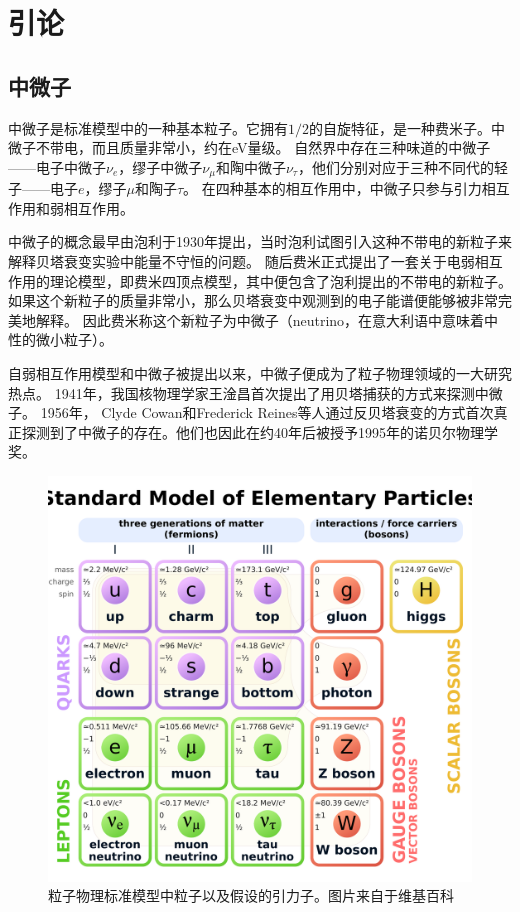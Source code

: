 \chapter{引论}
\label{chap:introduction}

\section{中微子}

中微子是标准模型中的一种基本粒子\cite{Griffiths:2008}。它拥有$1/2$的自旋特征，是一种费米子。中微子不带电，而且质量非常小，约在eV量级。
自然界中存在三种味道的中微子——电子中微子$\nu_e$，缪子中微子$\nu_\mu$和陶中微子$\nu_\tau$，他们分别对应于三种不同代的轻子——电子$e$，缪子$\mu$和陶子$\tau$。
在四种基本的相互作用中，中微子只参与引力相互作用和弱相互作用。

中微子的概念最早由泡利于1930年提出，当时泡利试图引入这种不带电的新粒子来解释贝塔衰变实验中能量不守恒的问题。
随后费米正式提出了一套关于电弱相互作用的理论模型，即费米四顶点模型，其中便包含了泡利提出的不带电的新粒子。
如果这个新粒子的质量非常小，那么贝塔衰变中观测到的电子能谱便能够被非常完美地解释。
因此费米称这个新粒子为中微子（neutrino，在意大利语中意味着中性的微小粒子）。

自弱相互作用模型和中微子被提出以来，中微子便成为了粒子物理领域的一大研究热点。
1941年，我国核物理学家王淦昌首次提出了用贝塔捕获的方式来探测中微子\cite{Wang:1942}。
1956年， Clyde Cowan和Frederick Reines等人通过反贝塔衰变的方式首次真正探测到了中微子的存在\cite{Cowan:1956}。他们也因此在约40年后被授予1995年的诺贝尔物理学奖。

\begin{figure}[htb]
    \centering
    \includegraphics[width=0.8\linewidth]{img/standard_model.pdf}
    \caption{粒子物理标准模型中粒子以及假设的引力子。图片来自于维基百科}
    \label{fig:standard_model}
\end{figure}

